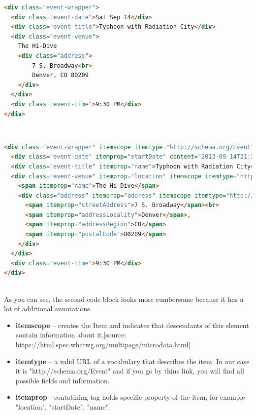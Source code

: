 \begin{lstlisting}[language=html, caption={Event information without semantic markup}, label={lst:htmlevent}, captionpos=b]
<div class="event-wrapper">
  <div class="event-date">Sat Sep 14</div>
  <div class="event-title">Typhoon with Radiation City</div>
  <div class="event-venue">
    The Hi-Dive
    <div class="address">
        7 S. Broadway<br>
        Denver, CO 80209
    </div>
  </div>
  <div class="event-time">9:30 PM</div>
</div>

\end{lstlisting}
\\

\begin{lstlisting}[language=html, caption={Event information annotated with Microdata}, label={lst:htmleventmark}, captionpos=b]
<div class="event-wrapper" itemscope itemtype="http://schema.org/Event">
  <div class="event-date" itemprop="startDate" content="2013-09-14T21:30">Sat Sep 14</div>
  <div class="event-title" itemprop="name">Typhoon with Radiation City</div>
  <div class="event-venue" itemprop="location" itemscope itemtype="http://schema.org/Place">
    <span itemprop="name">The Hi-Dive</span>
    <div class="address" itemprop="address" itemscope itemtype="http://schema.org/PostalAddress">
      <span itemprop="streetAddress">7 S. Broadway</span><br>
      <span itemprop="addressLocality">Denver</span>,
      <span itemprop="addressRegion">CO</span>
      <span itemprop="postalCode">80209</span>
    </div>
  </div>
  <div class="event-time">9:30 PM</div>
</div>

\end{lstlisting}\\


As you can see, the second code block looks more cumbersome because it has a lot of additional annotations. 

\begin{itemize}
    \item \textbf{itemscope} – creates the Item and indicates that descendants of this element contain information about it.[source: https://html.spec.whatwg.org/multipage/microdata.html]
    \item \textbf{itemtype} – a valid URL of a vocabulary that describes the item. In our case it is "http://schema.org/Event" and if you go by thins link, you will find all possible fields and information. 
    \item \textbf{itemprop} - contatining tag holds specific property of the item, for example "location", "startDate", "name".
\end{itemize}

